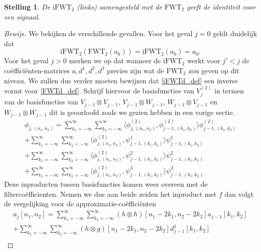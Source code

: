 \documentclass[11pt]{uvamath}
\theoremstyle{plain}
\newtheorem{stelling}{Stelling}[chapter]
\theoremstyle{definition}
\theoremstyle{remark}
\newcommand{\inpr}[2]{\langle #1 , #2 \rangle}
\begin{document}
\begin{stelling}
  De $\mathrm{iFWT}_2$ (links) samengesteld met de $\mathrm{FWT}_2$ geeft de identiteit voor een signaal.
\end{stelling}
\begin{proof}[Bewijs]
  We bekijken de verschillende gevallen. Voor het geval $j=0$ geldt duidelijk dat
  \[
  \mathrm{iFWT}_2(\mathrm{FWT}_2(a_0)) = \mathrm{iFWT}_2(a_0) = a_0.
  \]
  Voor het geval $j>0$ merken we op dat wanneer de $\mathrm{iFWT}_2$ werkt voor $j'<j$ de co\"effici\"enten-matrices
  $a,d^1,d^2,d^3$ precies zijn wat de $\mathrm{FWT}_2$ zou geven op dit niveau. 
  We zullen dus verder moeten bewijzen dat \ref{iFWTd_def} een inverse vormt voor
  \ref{FWTd_def}.
  Schrijf hiervoor de basisfuncties van $V^{(2)}_j$ in termen van de basisfuncties van 
  $V_{j-1}\otimes V_{j-1}$, $V_{j-1}\otimes W_{j-1}$, $W_{j-1}\otimes V_{j-1}$ en $W_{j-1}\otimes W_{j-1}$
  dit is geoorloofd zoals we gezien hebben in een vorige sectie.
  \begin{equation*}
    \begin{split}
      \phi_{j,(n_1,n_2)} = 
      \sum_{k_1=-\infty}^\infty\sum_{k_2=-\infty}^\infty 
      \inpr{\phi^{(2)}_{j,(n_1,n_2)}}{\phi^{(2)}_{j-1,(k_1,k_2)}} \phi^{(2)}_{j-1,(k_1,k_2)} \\
      + \sum_{k_1=-\infty}^\infty\sum_{k_2=-\infty}^\infty 
      \inpr{\phi^{(2)}_{j,(n_1,n_2)}}{\psi^1_{j-1,(k_1,k_2)}} \psi^1_{j-1,(k_1,k_2)} \\
      + \sum_{k_1=-\infty}^\infty\sum_{k_2=-\infty}^\infty 
      \inpr{\phi^{(2)}_{j,(n_1,n_2)}}{\psi^2_{j-1,(k_1,k_2)}} \psi^2_{j-1,(k_1,k_2)} \\
      + \sum_{k_1=-\infty}^\infty\sum_{k_2=-\infty}^\infty 
      \inpr{\phi^{(2)}_{j,(n_1,n_2)}}{\psi^3_{j-1,(k_1,k_2)}} \psi^3_{j-1,(k_1,k_2)}
      \end{split}
  \end{equation*}
  Deze inproducten tussen basisfuncties komen weer overeen met de filterco\"efficienten. Nemen we dus aan
  beide zeiden het inproduct met $f$ dan volgt de vergelijking voor de approximatie-co\"effici\"enten
  \begin{equation*}
    \begin{split}
      a_{j}[n_1,n_2] = 
      \sum_{k_1=-\infty}^\infty\sum_{k_2=-\infty}^\infty 
      (h\otimes h)[n_1-2k_1,n_2-2k_2] a_{j-1}[k_1,k_2] \\
      + \sum_{k_1=-\infty}^\infty\sum_{k_2=-\infty}^\infty 
      (h\otimes g)[n_1-2k_1,n_2-2k_2] d^1_{j-1}[k_1,k_2] \\

\end{split}
\end{equation*}
\end{proof}
\end{document}
